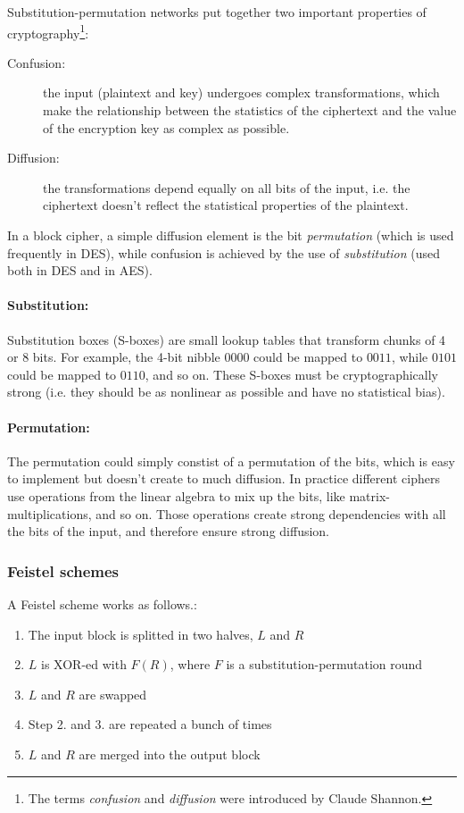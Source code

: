\documentclass{article}
\begin{document}
  Substitution-permutation networks put together two important
  properties of cryptography\footnote{The terms \emph{confusion} and
  \emph{diffusion} were introduced by Claude Shannon.}:

  \begin{description}
	\item[Confusion:] the input (plaintext and key) undergoes
	  complex transformations, which make the relationship between the
	  statistics of the ciphertext and the value of the encryption key
	  as complex as possible. 
	\item[Diffusion:] the transformations depend equally on all bits
	  of the input, i.e. the ciphertext doesn't reflect the
	  statistical properties of the plaintext.
  \end{description}

  In a block cipher, a simple diffusion element is the bit
  \emph{permutation} (which is used frequently in DES),
  while confusion is achieved
  by the use of \emph{substitution} (used both in DES and in AES).

  \paragraph{Substitution:}
  
  Substitution boxes (S-boxes) 
  are small lookup tables that transform chunks of
  4 or 8 bits. For example, the 4-bit nibble $0000$ could be mapped to
  $0011$, while $0101$ could be mapped to $0110$, and so on.
  These S-boxes must be cryptographically strong (i.e. they
  should be as nonlinear as possible and have no statistical bias).

  \paragraph{Permutation:}
  The permutation could simply constist of a permutation of the bits,
  which is easy to implement but doesn't create to much diffusion.
  In practice different ciphers use operations from the linear algebra 
  to mix up the bits, like matrix-multiplications, and so on.
  Those operations create strong dependencies with all the bits of the
  input, and therefore ensure strong diffusion.

  \subsubsection{Feistel schemes}

  A Feistel scheme works as follows.:  
  \begin{enumerate}
	\item The input block is splitted in two halves, $L$ and $R$
	\item $L$ is XOR-ed with $F(R)$, where $F$ is a
	  substitution-permutation round
	\item $L$ and $R$ are swapped
	\item Step 2. and 3. are repeated a bunch of times
	\item $L$ and $R$ are merged into the output block
  \end{enumerate}
\end{document}
